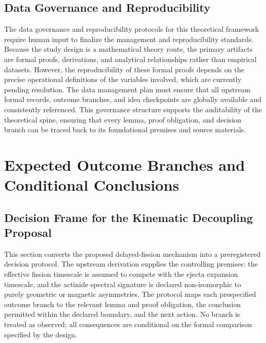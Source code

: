 \documentclass[conference]{IEEEtran}
\begin{document}
\subsection{Data Governance and Reproducibility}
The data governance and reproducibility protocols for this theoretical framework require human input to finalize the management and reproducibility standards. Because the study design is a mathematical theory route, the primary artifacts are formal proofs, derivations, and analytical relationships rather than empirical datasets. However, the reproducibility of these formal proofs depends on the precise operational definitions of the variables involved, which are currently pending resolution. The data management plan must ensure that all upstream formal records, outcome branches, and idea checkpoints are globally available and consistently referenced. This governance structure supports the auditability of the theoretical spine, ensuring that every lemma, proof obligation, and decision branch can be traced back to its foundational premises and source materials.

\section{Expected Outcome Branches and Conditional Conclusions}
\subsection{Decision Frame for the Kinematic Decoupling Proposal}
This section converts the proposed delayed-fission mechanism into a preregistered decision protocol. The upstream derivation supplies the controlling premises: the effective fission timescale is assumed to compete with the ejecta expansion timescale, and the actinide spectral signature is declared non-isomorphic to purely geometric or magnetic asymmetries. The protocol maps each prespecified outcome branch to the relevant lemma and proof obligation, the conclusion permitted within the declared boundary, and the next action. No branch is treated as observed; all consequences are conditional on the formal comparison specified by the design.
\end{document}
